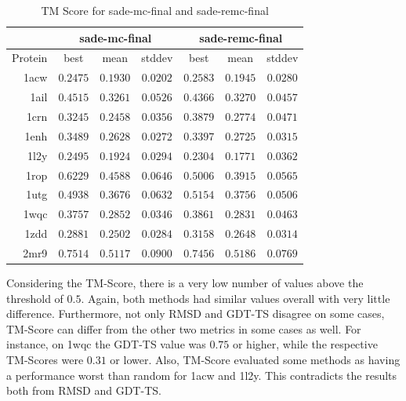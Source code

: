 \begin{table}
  \centering
  \begin{tabular}{r|c|c|c||c|c|c}
            & \multicolumn{3}{c}{sade-mc-final} & \multicolumn{3}{||c}{sade-remc-final} \\ \hline
    Protein & best          & mean          & stddev   & best          & mean          & stddev   \\ \hline \hline
    1acw    & $0.2475$      & $0.1930$      & $0.0202$ & $0.2583$      & $0.1945$      & $0.0280$ \\ \hline
    1ail    & $0.4515$      & $0.3261$      & $0.0526$ & $0.4366$      & $0.3270$      & $0.0457$ \\ \hline
    1crn    & $0.3245$      & $0.2458$      & $0.0356$ & $0.3879$      & $0.2774$      & $0.0471$ \\ \hline
    1enh    & $0.3489$      & $0.2628$      & $0.0272$ & $0.3397$      & $0.2725$      & $0.0315$ \\ \hline
    1l2y    & $0.2495$      & $0.1924$      & $0.0294$ & $0.2304$      & $0.1771$      & $0.0362$ \\ \hline
    1rop    & $\bm{0.6229}$ & $0.4588$      & $0.0646$ & $\bm{0.5006}$ & $0.3915$      & $0.0565$ \\ \hline
    1utg    & $0.4938$      & $0.3676$      & $0.0632$ & $\bm{0.5154}$ & $0.3756$      & $0.0506$ \\ \hline
    1wqc    & $0.3757$      & $0.2852$      & $0.0346$ & $0.3861$      & $0.2831$      & $0.0463$ \\ \hline
    1zdd    & $0.2881$      & $0.2502$      & $0.0284$ & $0.3158$      & $0.2648$      & $0.0314$ \\ \hline
    2mr9    & $\bm{0.7514}$ & $\bm{0.5117}$ & $0.0900$ & $\bm{0.7456}$ & $\bm{0.5186}$ & $0.0769$ \\ \hline
  \end{tabular}
  \caption{TM Score for sade-mc-final and sade-remc-final}
  \label{tab:tmscore-data}
\end{table}

Considering the TM-Score, there is a very low number of values above the
threshold of $0.5$. Again, both methods had similar values overall with very
little difference. Furthermore, not only RMSD and GDT-TS disagree on some cases,
TM-Score can differ from the other two metrics in some cases as well. For
instance, on 1wqc the GDT-TS value was $0.75$ or higher, while the respective
TM-Scores were $0.31$ or lower. Also, TM-Score evaluated some methods as having
a performance worst than random for 1acw and 1l2y. This contradicts the results
both from RMSD and GDT-TS.

